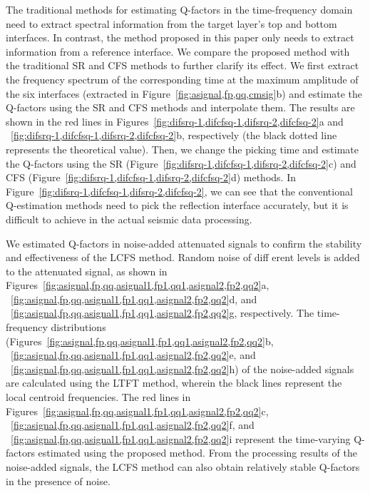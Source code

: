 The traditional methods for estimating Q-factors in the time-frequency
domain need to extract spectral information from the target layer’s
top and bottom interfaces. In contrast, the method proposed in this
paper only needs to extract information from a reference interface. We
compare the proposed method with the traditional SR and CFS methods to
further clarify its effect.  We first extract the frequency spectrum
of the corresponding time at the maximum amplitude of the six
interfaces (extracted in Figure~\ref{fig:asignal,fp,qq,cmsig}b) and
estimate the Q-factors using the SR and CFS methods and interpolate
them. The results are shown in the red lines in
Figures~\ref{fig:difsrq-1,difcfsq-1,difsrq-2,difcfsq-2}a and
~\ref{fig:difsrq-1,difcfsq-1,difsrq-2,difcfsq-2}b, respectively (the
black dotted line represents the theoretical value). Then, we change
the picking time and estimate the Q-factors using the SR
(Figure~\ref{fig:difsrq-1,difcfsq-1,difsrq-2,difcfsq-2}c) and CFS
(Figure~\ref{fig:difsrq-1,difcfsq-1,difsrq-2,difcfsq-2}d) methods. In
Figure~\ref{fig:difsrq-1,difcfsq-1,difsrq-2,difcfsq-2}, we can see
that the conventional Q-estimation methods need to pick the reflection
interface accurately, but it is difficult to achieve in the actual
seismic data processing.

We estimated Q-factors in noise-added attenuated signals to confirm
the stability and effectiveness of the LCFS method. Random noise of
diff erent levels is added to the attenuated signal, as shown in
Figures~\ref{fig:asignal,fp,qq,asignal1,fp1,qq1,asignal2,fp2,qq2}a,
~\ref{fig:asignal,fp,qq,asignal1,fp1,qq1,asignal2,fp2,qq2}d, and
~\ref{fig:asignal,fp,qq,asignal1,fp1,qq1,asignal2,fp2,qq2}g,
respectively.  The time-frequency distributions
(Figures~\ref{fig:asignal,fp,qq,asignal1,fp1,qq1,asignal2,fp2,qq2}b,
~\ref{fig:asignal,fp,qq,asignal1,fp1,qq1,asignal2,fp2,qq2}e, and
~\ref{fig:asignal,fp,qq,asignal1,fp1,qq1,asignal2,fp2,qq2}h) of the
noise-added signals are calculated using the LTFT method, wherein the
black lines represent the local centroid frequencies. The red lines in
Figures~\ref{fig:asignal,fp,qq,asignal1,fp1,qq1,asignal2,fp2,qq2}c,
~\ref{fig:asignal,fp,qq,asignal1,fp1,qq1,asignal2,fp2,qq2}f, and
~\ref{fig:asignal,fp,qq,asignal1,fp1,qq1,asignal2,fp2,qq2}i represent
the time-varying Q-factors estimated using the proposed method. From
the processing results of the noise-added signals, the LCFS method can
also obtain relatively stable Q-factors in the presence of noise.


